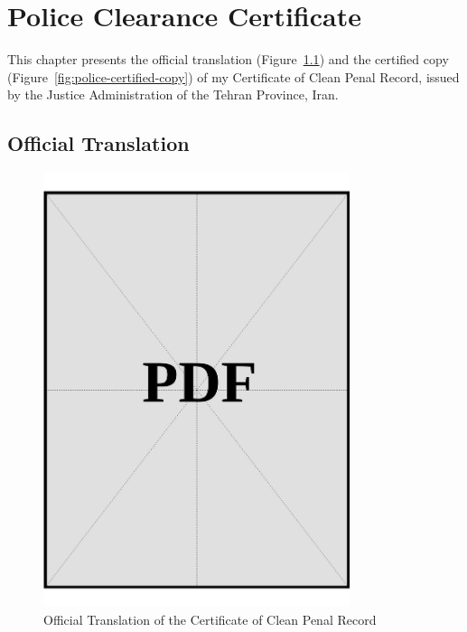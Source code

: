 
\chapter{Police Clearance Certificate}\label{sec:police-clearance-certificate}

\noindent This chapter presents the official translation (Figure~\ref{fig:police-official-translation}) and the certified copy (Figure~\ref{fig:police-certified-copy}) of my Certificate of Clean Penal Record, issued by the Justice Administration of the Tehran Province, Iran. 

\clearpage

\section*{Official Translation}
\vspace*{\fill}

\begin{figure}[h]
    \centering
    \includegraphics[page=1, width=0.8\textwidth]{../application-docs/applicant/police-clearance-certificate/official-translations.pdf}
    \caption{Official Translation of the Certificate of Clean Penal Record}
    \label{fig:police-official-translation}
\end{figure}
\vspace*{\fill}

